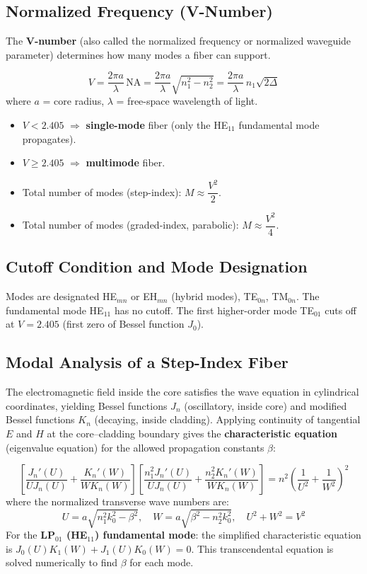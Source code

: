 \documentclass[12pt,a4paper]{article}
\begin{document}
\subsection{Normalized Frequency (V-Number)}
The \textbf{V-number} (also called the normalized frequency or normalized waveguide parameter) determines how many modes a fiber can support.

\begin{tcolorbox}[formulabox, title={\textbf{V-Number Formula}}]
\[
V = \frac{2\pi a}{\lambda}\,\text{NA} = \frac{2\pi a}{\lambda}\sqrt{n_1^2 - n_2^2} = \frac{2\pi a}{\lambda}\,n_1\sqrt{2\Delta}
\]
where $a$ = core radius, $\lambda$ = free-space wavelength of light.
\begin{itemize}[leftmargin=*, itemsep=2pt, topsep=4pt]
  \item $V < 2.405$ $\Rightarrow$ \textbf{single-mode} fiber (only the HE$_{11}$ fundamental mode propagates).
  \item $V \geq 2.405$ $\Rightarrow$ \textbf{multimode} fiber.
  \item Total number of modes (step-index): $M \approx \dfrac{V^2}{2}$.
  \item Total number of modes (graded-index, parabolic): $M \approx \dfrac{V^2}{4}$.
\end{itemize}
\end{tcolorbox}

\subsection{Cutoff Condition and Mode Designation}
Modes are designated HE$_{mn}$ or EH$_{mn}$ (hybrid modes), TE$_{0n}$, TM$_{0n}$. The fundamental mode HE$_{11}$ has no cutoff. The first higher-order mode TE$_{01}$ cuts off at $V = 2.405$ (first zero of Bessel function $J_0$).

\subsection{Modal Analysis of a Step-Index Fiber}
The electromagnetic field inside the core satisfies the wave equation in cylindrical coordinates, yielding Bessel functions $J_n$ (oscillatory, inside core) and modified Bessel functions $K_n$ (decaying, inside cladding). Applying continuity of tangential $E$ and $H$ at the core--cladding boundary gives the \textbf{characteristic equation} (eigenvalue equation) for the allowed propagation constants $\beta$:

\begin{tcolorbox}[formulabox, title={\textbf{Characteristic Equation for Step-Index Fiber}}]
\[
\left[ \frac{J_n'(U)}{U J_n(U)} + \frac{K_n'(W)}{W K_n(W)} \right]
\left[ \frac{n_1^2 J_n'(U)}{U J_n(U)} + \frac{n_2^2 K_n'(W)}{W K_n(W)} \right]
= n^2 \left(\frac{1}{U^2} + \frac{1}{W^2}\right)^{\!2}
\]
where the normalized transverse wave numbers are:
\[
U = a\sqrt{n_1^2 k_0^2 - \beta^2}, \quad W = a\sqrt{\beta^2 - n_2^2 k_0^2}, \quad U^2 + W^2 = V^2
\]
For the \textbf{LP$_{01}$ (HE$_{11}$) fundamental mode}: the simplified characteristic equation is $J_0(U) K_1(W) + J_1(U) K_0(W) = 0$. This transcendental equation is solved numerically to find $\beta$ for each mode.
\end{tcolorbox}
\end{document}
